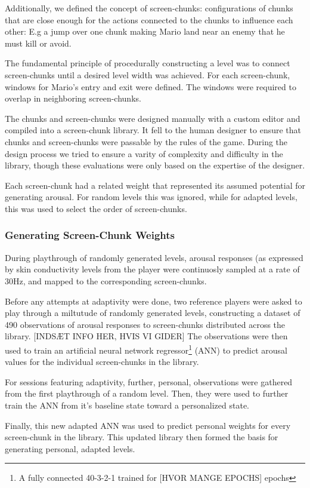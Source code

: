 \documentclass{llncs}
\begin{document}
Additionally, we defined the concept of screen-chunks: configurations of chunks that are close enough for the actions connected to the chunks to influence each other: E.g a jump over one chunk making Mario land near an enemy that he must kill or avoid.

The fundamental principle of procedurally constructing a level was to connect screen-chunks until a desired level width was achieved. For each screen-chunk, windows for Mario's entry and exit were defined. The windows were required to overlap in neighboring screen-chunks.

The chunks and screen-chunks were designed manually with a custom editor and compiled into a screen-chunk library. It fell to the human designer to ensure that chunks and screen-chunks were passable by the rules of the game. During the design process we tried to ensure a varity of complexity and difficulty in the library, though these evaluations were only based on the expertise of the designer.

Each screen-chunk had a related weight that represented its assumed potential for generating arousal. For random levels this was ignored, while for adapted levels, this was used to select the order of screen-chunks.

\subsubsection{Generating Screen-Chunk Weights}
During playthrough of randomly generated levels, arousal responses (as expressed by skin conductivity levels from the player were continuosly sampled at a rate of 30Hz, and mapped to the corresponding screen-chunks.

Before any attempts at adaptivity were done, two reference players were asked to play through a miltutude of randomly generated levels, constructing a dataset of 490 observations of arousal responses to screen-chunks distributed across the library. [INDSÆT INFO HER, HVIS VI GIDER] The observations were then used to train an artificial neural network regressor\footnote{A fully connected 40-3-2-1 trained for [HVOR MANGE EPOCHS] epochs} (ANN) to predict arousal values for the individual screen-chunks in the library.

For sessions featuring adaptivity, further, personal, observations were gathered from the first playthrough of a random level. Then, they were used to further train the ANN from it's baseline state toward a personalized state.

Finally, this new adapted ANN was used to predict personal weights for every screen-chunk in the library. This updated library then formed the basis for generating personal, adapted levels.
\end{document}
